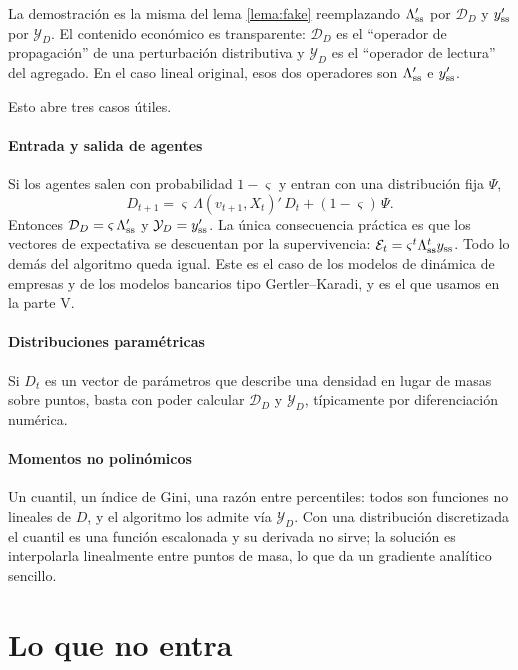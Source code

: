 La demostración es la misma del lema \ref{lema:fake} reemplazando $\Lambda_{\mathrm{ss}}'$
por $\mathcal{D}_D$ y $y_{\mathrm{ss}}'$ por $\mathcal{Y}_D$. El contenido económico es
transparente: $\mathcal{D}_D$ es el ``operador de propagación'' de una
perturbación distributiva y $\mathcal{Y}_D$ es el ``operador de lectura'' del
agregado. En el caso lineal original, esos dos operadores son $\Lambda_{\mathrm{ss}}'$ e
$y_{\mathrm{ss}}'$.

Esto abre tres casos útiles.

\paragraph{Entrada y salida de agentes} Si los agentes salen con probabilidad
$1-\varsigma$ y entran con una distribución fija $\Psi$,
\begin{equation}
D_{t+1} = \varsigma\, \Lambda(v_{t+1},X_t)'\,D_t + (1-\varsigma)\,\Psi .
\end{equation}
Entonces $\mathcal{D}_D = \varsigma\,\Lambda'_{\mathrm{ss}}$ y $\mathcal{Y}_D = y_{\mathrm{ss}}'$. La
única consecuencia práctica es que los vectores de expectativa se descuentan por
la supervivencia: $\mathcal{E}_t = \varsigma^t \Lambda_{\mathrm{ss}}^t y_{\mathrm{ss}}$. Todo lo demás del
algoritmo queda igual. Este es el caso de los modelos de dinámica de empresas y
de los modelos bancarios tipo Gertler--Karadi, y es el que usamos en la parte V.

\paragraph{Distribuciones paramétricas} Si $D_t$ es un vector de parámetros que
describe una densidad en lugar de masas sobre puntos, basta con poder calcular
$\mathcal{D}_D$ y $\mathcal{Y}_D$, típicamente por diferenciación numérica.

\paragraph{Momentos no polinómicos} Un cuantil, un índice de Gini, una razón
entre percentiles: todos son funciones no lineales de $D$, y el algoritmo los
admite vía $\mathcal{Y}_D$. Con una distribución discretizada el cuantil es una
función escalonada y su derivada no sirve; la solución es interpolarla
linealmente entre puntos de masa, lo que da un gradiente analítico sencillo.

\section{Lo que no entra}

